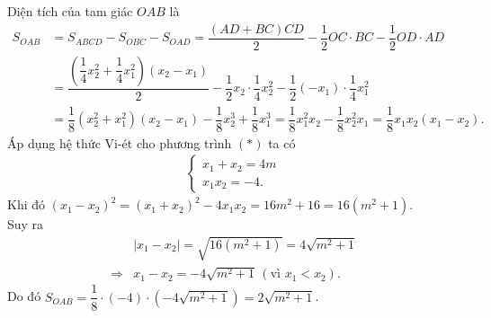 \begin{ex}
{\begin{enumerate}
{
   }
   Diện tích của tam giác $OAB$ là
   \begin{align*}
    S_{OAB} & = S_{ABCD} - S_{OBC} - S_{OAD} = \dfrac{(AD + BC)CD}{2} - \dfrac{1}{2}OC \cdot BC - \dfrac{1}{2}OD \cdot AD\\
    		& = \dfrac{\left( \dfrac{1}{4}x_2^2 + \dfrac{1}{4}x_1^2 \right)(x_2 - x_1)}{2} - \dfrac{1}{2}x_2 \cdot \dfrac{1}{4}x_2^2 - \dfrac{1}{2}(-x_1)\cdot\dfrac{1}{4}x_1^2\\
    		& = \dfrac{1}{8}(x_2^2 + x_1^2)(x_2 - x_1) - \dfrac{1}{8}x_2^3 + \dfrac{1}{8}x_1^3 = \dfrac{1}{8}x_1^2x_2 - \dfrac{1}{8}x_2^2x_1 = \dfrac{1}{8}x_1x_2(x_1 - x_2).
   \end{align*}
   Áp dụng hệ thức Vi-ét cho phương trình $(*)$ ta có
   \begin{align*}
    \begin{cases} x_1 + x_2 = 4m \\ x_1x_2 = -4.  \end{cases}
   \end{align*}
   Khi đó $(x_1 - x_2)^2 = (x_1 + x_2)^2 - 4x_1x_2 = 16m^2 + 16 = 16(m^2+1)$.\\
   Suy ra
   \begin{align*}
    & |x_1 - x_2| = \sqrt{16(m^2+1)} = 4\sqrt{m^2 + 1}\\
    \Rightarrow & x_1 - x_2 = -4\sqrt{m^2+1} \, (\text{vì } x_1 < x_2).
   \end{align*}
   Do đó $S_{OAB} = \dfrac{1}{8} \cdot (-4) \cdot \left(-4\sqrt{m^2+1} \right) = 2\sqrt{m^2+1}$.
  \end{enumerate}
  }
\end{ex}  


